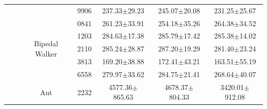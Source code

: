 \begin{table}[t]
\begin{tabular}{ccccccc}
                              &                       &                                 & 9906        & 237.33$\pm$29.23                                                               & 245.07$\pm$20.08                                                           & 231.25$\pm$25.67                                                           \\ 
        \cline{3-7}
                              &                       & \multirow{5}{*}{Bipedal Walker} & 0841        & 261.23$\pm$33.91                                                               & 254.18$\pm$35.26                                                           & 264.38$\pm$34.52                                                           \\
                              &                       &                                 & 1203        & 284.63$\pm$17.38                                                               & 285.79$\pm$17.42                                                           & 285.38$\pm$14.02                                                           \\
                              &                       &                                 & 2110        & 285.24$\pm$28.87                                                               & 287.20$\pm$19.29                                                           & 281.40$\pm$23.24                                                           \\
                              &                       &                                 & 3813        & 169.20$\pm$38.88                                                               & 172.41$\pm$43.21                                                           & 163.51$\pm$55.19                                                           \\
                              &                       &                                 & 6558        & 279.97$\pm$33.62                                                               & 284.75$\pm$21.41                                                           & 268.64$\pm$40.07                                                           \\ 
        \cline{3-7}
                              &                       & \multirow{5}{*}{Ant}            & 2232        & 4577.36$\pm$865.63                                                             & 4678.37$\pm$804.33                                                         & 3420.01$\pm$912.08                                                         \\

\end{tabular}
\end{table}

